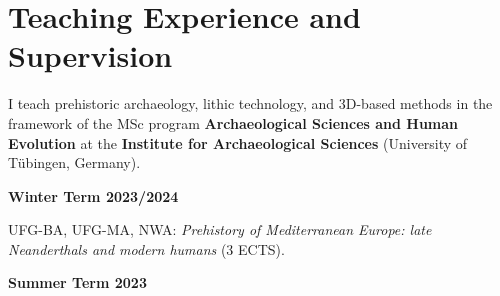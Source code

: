 \documentclass[11pt,a4paper,]{awesome-cv}
\begin{document}
\begin{cventries}
\end{cventries}

\small
\setlength{\leftskip}{0cm}

\hypertarget{teaching-experience-and-supervision}{%
\section{Teaching Experience and
Supervision}\label{teaching-experience-and-supervision}}

I teach prehistoric archaeology, lithic technology, and 3D-based methods
in the framework of the MSc program \textbf{Archaeological Sciences and
Human Evolution}
\href{https://uni-tuebingen.de/en/study/finding-a-course/degree-programs-available/detail/course/archaeological-sciences-and-human-evolution-master/}{\faExternalLink}
at the \textbf{Institute for Archaeological Sciences}
\href{https://uni-tuebingen.de/en/faculties/faculty-of-science/departments/geosciences/work-groups-contacts/prehistory-and-archaeological-sciences/ina/}{\faExternalLink}
(University of Tübingen, Germany).

\setlength{\leftskip}{0cm}

\textbf{Winter Term 2023/2024}

\setlength{\leftskip}{1cm}

UFG-BA, UFG-MA, NWA: \emph{Prehistory of Mediterranean Europe: late
Neanderthals and modern humans} (3 ECTS).

\setlength{\leftskip}{0cm}

\textbf{Summer Term 2023}

\setlength{\leftskip}{1cm}
\end{document}
